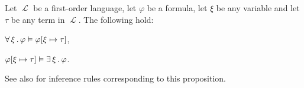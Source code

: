 \begin{proposition}\label{thm:quantifier_satisfiability}
  Let \( \mscrL \) be a first-order language, let \( \varphi \) be a formula, let \( \xi \) be any variable and let \( \tau \) be any term in \( \mscrL \). The following hold:

  \begin{thmenum}
     \( \forall \thinspace \xi \thinspace . \thinspace \varphi \vDash \varphi[\xi \mapsto \tau] \),

     \( \varphi[\xi \mapsto \tau] \vDash \exists \thinspace \xi \thinspace . \thinspace \varphi \).
  \end{thmenum}

  See also  for inference rules corresponding to this proposition.
\end{proposition}
